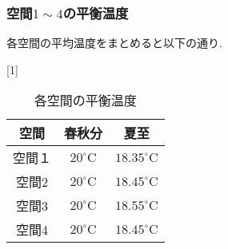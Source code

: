 \subsubsection{空間$1 \sim 4$の平衡温度}
各空間の平均温度をまとめると以下の通り.
\begin{table}[H]
  \begin{center}
  \caption{各空間の平衡温度}
  \scalebox{1}[1]{
  \begin{tabular}{|c|c|c|} \hline
    空間 &  春秋分 & 夏至 \\ \hline

  空間１
  & ${20}^\circ\mathrm{C}$
  & ${18.35}^\circ\mathrm{C}$\\

  空間2
  & ${20}^\circ\mathrm{C}$
  & ${18.45}^\circ\mathrm{C}$\\

  空間3
  & ${20}^\circ\mathrm{C}$
  & ${18.55}^\circ\mathrm{C}$\\

  空間4
  & ${20}^\circ\mathrm{C}$
  & ${18.45}^\circ\mathrm{C}$\\\hline
  \end{tabular}
  }
\end{center}
\end{table}
